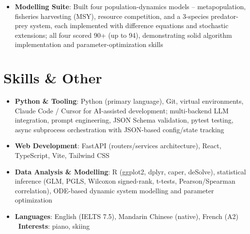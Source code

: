 \documentclass{my-resume}
\begin{document}
\begin{itemize}[parsep=0.2ex]
  \item \textbf{Modelling Suite}: Built four population-dynamics models -- metapopulation, fisheries harvesting (MSY), resource competition, and a 3-species predator-prey system, each implemented with difference equations and stochastic extensions; all four scored 90+ (up to 94), demonstrating solid algorithm implementation and parameter-optimization skills
\end{itemize}

\section{Skills \& Other}
\entrySkillsSep
\begin{itemize}[parsep=0.2ex]
  \item \textbf{Python \& Tooling}: Python (primary language), Git, virtual environments, Claude Code / Cursor for AI-assisted development; multi-backend LLM integration, prompt engineering, JSON Schema validation, pytest testing, async subprocess orchestration with JSON-based config/state tracking
  \item \textbf{Web Development}: FastAPI (routers/services architecture), React, TypeScript, Vite, Tailwind CSS
  \item \textbf{Data Analysis \& Modelling}: R (ggplot2, dplyr, caper, deSolve), statistical inference (GLM, PGLS, Wilcoxon signed-rank, t-tests, Pearson/Spearman correlation), ODE-based dynamic system modelling and parameter optimization
  \item \textbf{Languages}: English (IELTS 7.5), Mandarin Chinese (native), French (A2) \textbar\ \textbf{Interests}: piano, skiing
\end{itemize}
\end{document}
